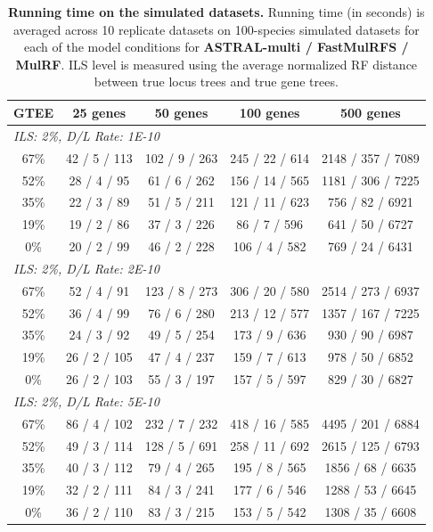 \clearpage

\begin{table}[!h]
\centering
\setlength{\tabcolsep}{6pt}
\small
\caption{{\bf Running time on the simulated datasets.} Running time (in seconds) is averaged across 10 replicate datasets on 100-species simulated datasets for each of the model conditions for \textbf{ASTRAL-multi / FastMulRFS / MulRF}. 
ILS level is measured using the average normalized RF distance between true locus trees and true gene trees.}\label{tab:fastmulrfs-rt}
\label{tab:timings}
\begin{tabular}{ccccc}
\toprule
GTEE & 25 genes & 50 genes & 100 genes & 500 genes\\
\midrule
\multicolumn{5}{l}{\em ILS: 2\%, D/L Rate: 1E-10}\\[0.5ex]
67\% & 42 / 5 / 113 & 102 / 9 / 263 & 245 / 22 / 614 & 2148 / 357 / 7089\\
52\% & 28 / 4 / 95 & 61 / 6 / 262 & 156 / 14 / 565 & 1181 / 306 / 7225\\
35\% & 22 / 3 / 89 & 51 / 5 / 211 & 121 / 11 / 623 & 756 / 82 / 6921\\
19\% & 19 / 2 / 86 & 37 / 3 / 226 & 86 / 7 / 596 & 641 / 50 / 6727\\
0\% & 20 / 2 / 99 & 46 / 2 / 228 & 106 / 4 / 582 & 769 / 24 / 6431\\[2ex]
\multicolumn{5}{l}{\em ILS: 2\%, D/L Rate: 2E-10}\\[0.5ex]
67\% & 52 / 4 / 91 & 123 / 8 / 273 & 306 / 20 / 580 & 2514 / 273 / 6937\\
52\% & 36 / 4 / 99 & 76 / 6 / 280 & 213 / 12 / 577 & 1357 / 167 / 7225\\
35\% & 24 / 3 / 92 & 49 / 5 / 254 & 173 / 9 / 636 & 930 / 90 / 6987\\
19\% & 26 / 2 / 105 & 47 / 4 / 237 & 159 / 7 / 613 & 978 / 50 / 6852\\
0\% & 26 / 2 / 103 & 55 / 3 / 197 & 157 / 5 / 597 & 829 / 30 / 6827\\[2ex]
\multicolumn{5}{l}{\em ILS: 2\%, D/L Rate: 5E-10}\\[0.5ex]
67\% & 86 / 4 / 102 & 232 / 7 / 232 & 418 / 16 / 585 & 4495 / 201 / 6884\\
52\% & 49 / 3 / 114 & 128 / 5 / 691 & 258 / 11 / 692 & 2615 / 125 / 6793\\
35\% & 40 / 3 / 112 & 79 / 4 / 265 & 195 / 8 / 565 & 1856 / 68 / 6635\\
19\% & 32 / 2 / 111 & 84 / 3 / 241 & 177 / 6 / 546 & 1288 / 53 / 6645\\
0\% & 36 / 2 / 110 & 83 / 3 / 215 & 153 / 5 / 542 & 1308 / 35 / 6608\\[2ex]

\end{tabular}
\end{table}
